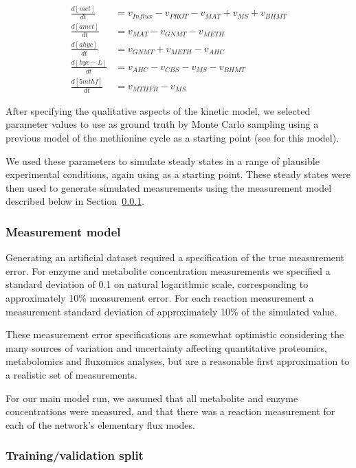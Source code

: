\documentclass[journal=asbcd6,manuscript=article,layout=traditional]{achemso}
\begin{document}
\begin{align}
\frac{d[met]}{dt} &= v_{Influx} - v_{PROT} - v_{MAT} +v_{MS} + v_{BHMT} \label{eq-meth-ode} \\
\frac{d[amet]}{dt} &= v_{MAT} - v_{GNMT} - v_{METH} \nonumber \\
\frac{d[ahyc]}{dt} &= v_{GNMT} + v_{METH} - v_{AHC} \nonumber \\
\frac{d[hyc-L]}{dt} &= v_{AHC} - v_{CBS} - v_{MS} - v_{BHMT} \nonumber \\
\frac{d[5mthf]}{dt} &= v_{MTHFR} - v_{MS} \nonumber 
\end{align}

After specifying the qualitative aspects of the kinetic model, we
selected parameter values to use as ground truth by Monte Carlo sampling
using a previous model of the methionine cycle as a starting point (see
\citet{saa_general_2015} for this model).

We used these parameters to simulate steady states in a range of
plausible experimental conditions, again using \citet{saa_general_2015}
as a starting point. These steady states were then used to generate
simulated measurements using the measurement model described below in
Section~\ref{sec-methionine-measurement-model}.

\hypertarget{sec-methionine-measurement-model}{%
\subsubsection{Measurement
model}\label{sec-methionine-measurement-model}}

Generating an artificial dataset required a specification of the true
measurement error. For enzyme and metabolite concentration measurements
we specified a standard deviation of 0.1 on natural logarithmic scale,
corresponding to approximately 10\% measurement error. For each reaction
measurement a measurement standard deviation of approximately 10\% of
the simulated value.

These measurement error specifications are somewhat optimistic
considering the many sources of variation and uncertainty affecting
quantitative proteomics, metabolomics and fluxomics analyses, but are a
reasonable first approximation to a realistic set of measurements.

For our main model run, we assumed that all metabolite and enzyme
concentrations were measured, and that there was a reaction measurement
for each of the network's elementary flux modes.

\hypertarget{trainingvalidation-split}{%
\subsubsection{Training/validation
split}\label{trainingvalidation-split}}
\end{document}
